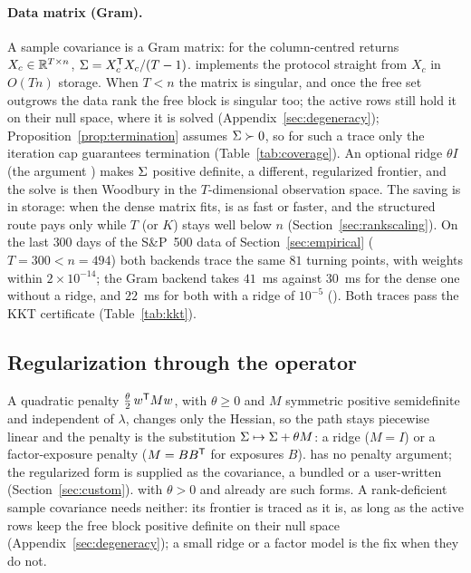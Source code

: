 \paragraph{Data matrix (Gram).}
\label{sec:gram}
A sample covariance is a Gram matrix: for the column-centred returns
$X_c\in\mathbb{R}^{T\times n}$, $\Sigma = X_c^{\mathsf{T}} X_c/(T-1)$.  implements
the protocol straight from $X_c$ in $O(Tn)$ storage. When $T<n$ the matrix is singular,
and once the free set outgrows the data rank the free block is singular too; the active
rows still hold it on their null space, where it is solved (Appendix~\ref{sec:degeneracy});
Proposition~\ref{prop:termination} assumes $\Sigma \succ 0$, so for such a trace only the
iteration cap guarantees termination (Table~\ref{tab:coverage}).
An optional ridge $\theta I$ (the argument ) makes $\Sigma$ positive definite,
a different, regularized frontier, and the solve is then Woodbury in the
$T$-dimensional observation space. The saving is in storage: when the dense matrix fits,
 is as fast or faster, and the structured route pays only while $T$
(or $K$) stays well below $n$ (Section~\ref{sec:rankscaling}). On the last $300$ days of
the S\&P~500 data of Section~\ref{sec:empirical} ($T = 300 < n = 494$) both backends trace
the same $81$ turning points, with weights within $2\times10^{-14}$; the Gram backend
takes $41$~ms against $30$~ms for the dense one without a ridge, and $22$~ms for both with
a ridge of $10^{-5}$ (). Both traces pass the KKT certificate
(Table~\ref{tab:kkt}).

\subsection{Regularization through the operator}
\label{sec:regularization}

A quadratic penalty $\tfrac{\theta}{2}\, w^{\mathsf{T}} M w$, with $\theta \ge 0$ and $M$
symmetric positive semidefinite and independent of $\lambda$, changes only the Hessian,
so the path stays piecewise linear and the penalty is the substitution
$\Sigma \mapsto \Sigma + \theta M$: a ridge ($M = I$) or a factor-exposure penalty
($M = B B^{\mathsf{T}}$ for exposures $B$).  has no penalty argument; the regularized
form is supplied as the covariance, a bundled or a user-written 
(Section~\ref{sec:custom}).  with $\theta>0$ and 
already are such forms. A rank-deficient sample covariance needs neither: its frontier
is traced as it is, as long as the active rows keep the free block positive definite on
their null space (Appendix~\ref{sec:degeneracy}); a small ridge or a factor model is the
fix when they do not.

